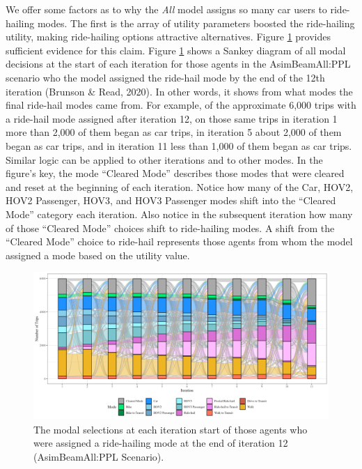 \documentclass[fancy, masters]{byuthesis}
\begin{document}
We offer some factors as to why the \emph{All} model assigns so many car users to ride-hailing modes. The first is the array of utility parameters boosted the ride-hailing utility, making ride-hailing options attractive alternatives. Figure \ref{fig:sankey} provides sufficient evidence for this claim. Figure \ref{fig:sankey} shows a Sankey diagram of all modal decisions at the start of each iteration for those agents in the AsimBeamAll:PPL scenario who the model assigned the ride-hail mode by the end of the 12th iteration (Brunson \& Read, 2020). In other words, it shows from what modes the final ride-hail modes came from. For example, of the approximate 6,000 trips with a ride-hail mode assigned after iteration 12, on those same trips in iteration 1 more than 2,000 of them began as car trips, in iteration 5 about 2,000 of them began as car trips, and in iteration 11 less than 1,000 of them began as car trips. Similar logic can be applied to other iterations and to other modes. In the figure's key, the mode ``Cleared Mode'' describes those modes that were cleared and reset at the beginning of each iteration. Notice how many of the Car, HOV2, HOV2 Passenger, HOV3, and HOV3 Passenger modes shift into the ``Cleared Mode'' category each iteration. Also notice in the subsequent iteration how many of those ``Cleared Mode'' choices shift to ride-hailing modes. A shift from the ``Cleared Mode'' choice to ride-hail represents those agents from whom the model assigned a mode based on the utility value.

\begin{figure}

\centering
\includegraphics[width = 1.05\paperwidth]{planshifts.png}
\caption[Selection process of agents who the model assigned to ride-hail.]{The modal selections at each iteration start of those agents who were assigned a ride-hailing mode at the end of iteration 12 (AsimBeamAll:PPL Scenario).}
\label{fig:sankey}

\end{figure}
\end{document}
